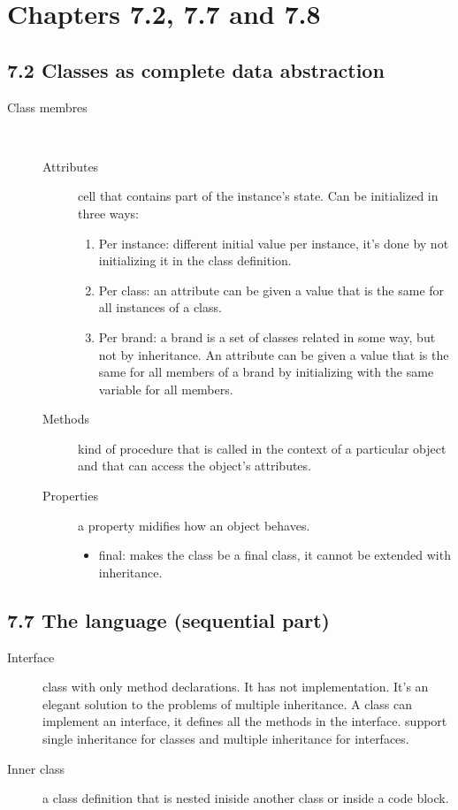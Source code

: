 \section{Chapters 7.2, 7.7 and 7.8}
\subsection{7.2 Classes as complete data abstraction}
\begin{description}
  \item[Class membres]~%
    \begin{description}
      \item[Attributes] cell that contains part of the instance's state.
        Can be initialized in three ways:
        \begin{enumerate}
          \item Per instance: different initial value per instance, it's done by not initializing it in the class definition.
          \item Per class: an attribute can be given a value that is the same for all instances of a class.
          \item Per brand: a brand is a set of classes related in some way, but not by inheritance.
            An attribute can be given a value that is the same for all members of a brand by initializing with the same variable for all members.
        \end{enumerate}
      \item[Methods] kind of procedure that is called in the context of a particular object and that can access the object's attributes.
      \item[Properties] a property midifies how an object behaves.
        \begin{itemize}
          \item final: makes the class be a final class, it cannot be extended with inheritance.
        \end{itemize}
    \end{description}
\end{description}

\subsection{7.7 The \java{} language (sequential part)}
\begin{description}
  \item[Interface] class with only method declarations.
    It has not implementation.
    It's an elegant solution to the problems of multiple inheritance.
    A class can implement an interface, it defines all the methods in the interface.
    \java{} support single inheritance for classes and multiple inheritance for interfaces.
  \item[Inner class] a class definition that is nested iniside another class or inside a code block.
\end{description}

